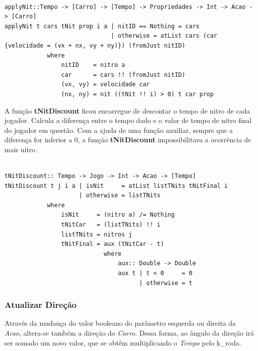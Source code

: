 \documentclass[a4paper]{report} %
\begin{document}
\scriptsize

\begin{verbatim}

applyNit::Tempo -> [Carro] -> [Tempo] -> Propriedades -> Int -> Acao -> [Carro]
applyNit t cars tNit prop i a | nitID == Nothing = cars
                              | otherwise = atList cars (car {velocidade = (vx + nx, vy + ny)}) (fromJust nitID)
            where
                nitID    = nitro a
                car      = cars !! (fromJust nitID)
                (vx, vy) = velocidade car
                (nx, ny) = nit ((tNit !! i) > 0) t car prop

\end{verbatim}

\normalsize

A função \textbf{tNitDiscount} ficou encarregue de descontar o tempo de nitro de cada jogador. Calcula a diferença entre o tempo dado e o valor de tempo de nitro final do jogador em questão. Com a ajuda de uma função auxiliar, sempre que a diferença for inferior a 0, a função \textbf{tNitDiscount} impossibilitava a ocorrência de mais nitro.


\scriptsize

\begin{verbatim}

tNitDiscount:: Tempo -> Jogo -> Int -> Acao -> [Tempo]
tNitDiscount t j i a | isNit     = atList listTNits tNitFinal i
                     | otherwise = listTNits         
            where
                isNit     = (nitro a) /= Nothing
                tNitCar   = (listTNits) !! i
                listTNits = nitros j
                tNitFinal = aux (tNitCar - t)
                            where
                                aux:: Double -> Double
                                aux t | t < 0     = 0
                                      | otherwise = t

\end{verbatim}

\newpage

\normalsize

\subsubsection{Atualizar Direção}

Através da mudança do valor booleano do parâmetro esquerda ou direita da \emph{Acao}, altera-se também a direção do \emph{Carro}. Dessa forma, ao ângulo da direção irá ser somado um novo valor, que se obtêm multiplicando o \emph{Tempo} pelo k_roda.
\end{document}
